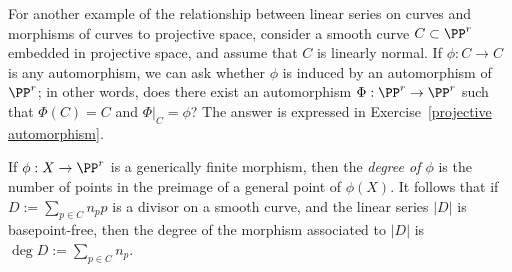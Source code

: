 For another example of the relationship between linear series on curves and morphisms of curves to projective space, consider a smooth curve $C \subset \PP^r$ embedded in projective space, and assume that $C$ is linearly normal. If $\phi : C \to C$ is any automorphism, we can ask whether $\phi$ is induced by an automorphism of $\PP^r$; in other words, does there exist an automorphism $\Phi : \PP^r \to \PP^r$ such that $\Phi(C) = C$ and $\Phi|_C = \phi$? The answer is expressed in Exercise~\ref{projective automorphism}.


If $\phi:X \to \PP^r$ is a generically finite morphism, then the \emph{degree of $\phi$} is the number of points in the preimage of a general point of $\phi(X)$. It follows that if $D := \sum_{p\in C} n_pp$ is a divisor on a smooth curve, and the linear series $|D|$ is basepoint-free, then the degree of the morphism associated to $|D|$ is $\deg D := \sum_{p\in C} n_p$.

